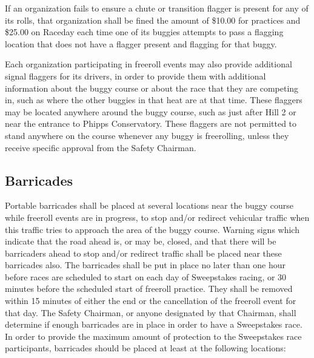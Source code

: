 	If an organization fails to ensure a chute or transition flagger is present
    for any of its rolls, that organization shall be fined the amount of \$10.00
	for practices and \$25.00 on Raceday each time one of its buggies attempts
    to pass a flagging location that does not have a flagger present and
    flagging for that buggy.

	Each organization participating in freeroll events may also provide
	additional signal flaggers for its drivers, in order to provide them with
	additional information about the buggy course or about the race that they are
	competing in, such as where the other buggies in that heat are at that time.
	These flaggers may be located anywhere around the buggy course, such as just
	after Hill 2 or near the entrance to Phipps Conservatory. These flaggers are
	not permitted to stand anywhere on the course whenever any buggy is
	freerolling, unless they receive specific approval from the Safety Chairman.


\subsection{Barricades}
\label{subsec:Barricades}

	Portable barricades shall be placed at several locations near the buggy
	course while freeroll events are in progress, to stop and/or redirect
	vehicular traffic when this traffic tries to approach the area of the buggy
	course. Warning signs which indicate that the road ahead is, or may be, closed,
	and that there will be barricaders ahead to stop and/or redirect traffic shall be
	placed near these barricades also. The barricades shall be put in place no
	later than one hour before races are scheduled to start on each day of
	Sweepstakes racing, or 30 minutes before the scheduled start of freeroll
	practice. They shall be removed within 15 minutes of either the end or the
	cancellation of the freeroll event for that day. The
	Safety Chairman, or anyone designated by that Chairman, shall determine if
	enough barricades are in place in order to have a Sweepstakes race. In order to
	provide the maximum amount of protection to the Sweepstakes race participants,
	barricades should be placed at least at the following locations:

